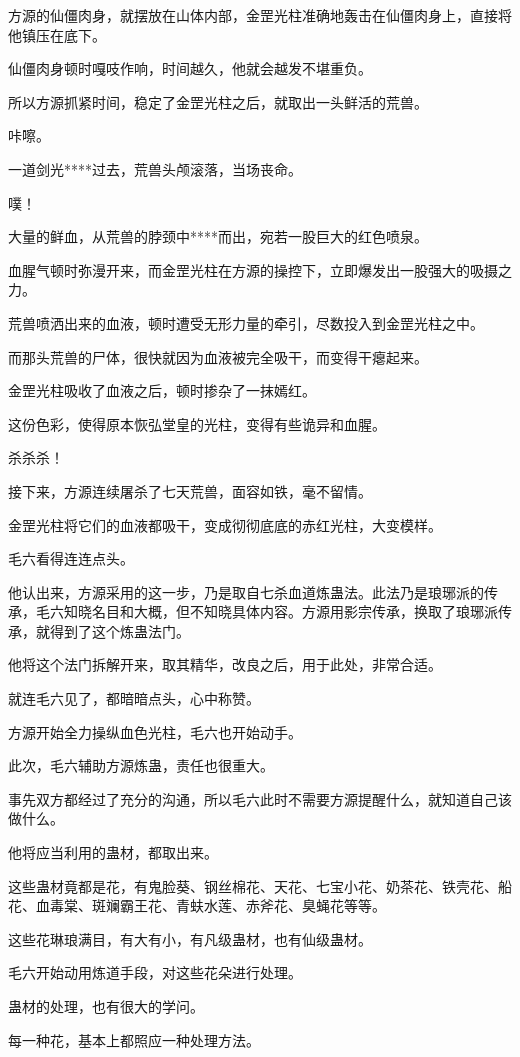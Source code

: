 \begin{this_body}
方源的仙僵肉身，就摆放在山体内部，金罡光柱准确地轰击在仙僵肉身上，直接将他镇压在底下。

仙僵肉身顿时嘎吱作响，时间越久，他就会越发不堪重负。

所以方源抓紧时间，稳定了金罡光柱之后，就取出一头鲜活的荒兽。

咔嚓。

一道剑光****过去，荒兽头颅滚落，当场丧命。

噗！

大量的鲜血，从荒兽的脖颈中****而出，宛若一股巨大的红色喷泉。

血腥气顿时弥漫开来，而金罡光柱在方源的操控下，立即爆发出一股强大的吸摄之力。

荒兽喷洒出来的血液，顿时遭受无形力量的牵引，尽数投入到金罡光柱之中。

而那头荒兽的尸体，很快就因为血液被完全吸干，而变得干瘪起来。

金罡光柱吸收了血液之后，顿时掺杂了一抹嫣红。

这份色彩，使得原本恢弘堂皇的光柱，变得有些诡异和血腥。

杀杀杀！

接下来，方源连续屠杀了七天荒兽，面容如铁，毫不留情。

金罡光柱将它们的血液都吸干，变成彻彻底底的赤红光柱，大变模样。

毛六看得连连点头。

他认出来，方源采用的这一步，乃是取自七杀血道炼蛊法。此法乃是琅琊派的传承，毛六知晓名目和大概，但不知晓具体内容。方源用影宗传承，换取了琅琊派传承，就得到了这个炼蛊法门。

他将这个法门拆解开来，取其精华，改良之后，用于此处，非常合适。

就连毛六见了，都暗暗点头，心中称赞。

方源开始全力操纵血色光柱，毛六也开始动手。

此次，毛六辅助方源炼蛊，责任也很重大。

事先双方都经过了充分的沟通，所以毛六此时不需要方源提醒什么，就知道自己该做什么。

他将应当利用的蛊材，都取出来。

这些蛊材竟都是花，有鬼脸葵、钢丝棉花、天花、七宝小花、奶茶花、铁壳花、船花、血毒棠、斑斓霸王花、青蚨水莲、赤斧花、臭蝇花等等。

这些花琳琅满目，有大有小，有凡级蛊材，也有仙级蛊材。

毛六开始动用炼道手段，对这些花朵进行处理。

蛊材的处理，也有很大的学问。

每一种花，基本上都照应一种处理方法。


\end{this_body}
